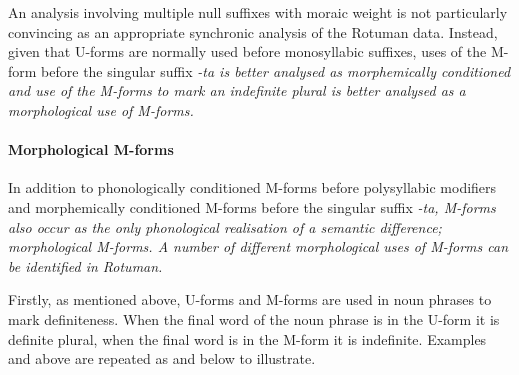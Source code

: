 \begin{exe}
\label{ex:RotExcShoFor}
\end{exe}

An analysis involving multiple null suffixes with moraic weight
is not particularly convincing as an appropriate synchronic analysis of the Rotuman data.
Instead, given that U-forms are normally used before monosyllabic suffixes,
uses of the M-form before the singular suffix \it{-ta}
is better analysed as morphemically conditioned
and use of the M-forms to mark an indefinite plural is better
analysed as a morphological use of M-forms.

\paragraph{Morphological M-forms}\label{sec:RotMorMfo}
In addition to phonologically conditioned M-forms before polysyllabic modifiers
and morphemically conditioned M-forms before the singular suffix \it{-ta},
M-forms also occur as the only phonological realisation
of a semantic difference; morphological M-forms.
A number of different morphological uses of M-forms can be identified in Rotuman.

Firstly, as mentioned above,
U-forms and M-forms are used in noun phrases to mark definiteness.
When the final word of the noun phrase is in the U-form it is definite plural,
when the final word is in the M-form it is indefinite.
Examples  and  above
are repeated as  and  below to illustrate.

\begin{multicols}{2}
	\begin{exe}\let\eachwordone=\it
		\label{ex2:RotDef}
		\label{ex2:RotInd}
	\end{exe}
\end{multicols}

